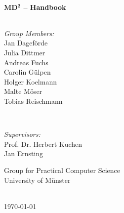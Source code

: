 \documentclass[a4paper, 12pt, titlepage, headsepline, listof = totoc, bibliography = totoc, numbers = noenddot]{scrbook} %
\begin{document}
\begin{titlepage}
\HRule \\[0.8cm]
{ \huge \bfseries MD$\mathbf{^2}$ -- Handbook}\\[0.4cm] %
\HRule \\[3cm]
 

\begin{minipage}[t]{0.4\textwidth}
\begin{flushleft} \large
\emph{Group Members:}\\
Jan Dageförde\\
Julia Dittmer\\
Andreas Fuchs\\
Carolin Gülpen\\
Holger Koelmann\\
Malte Möser\\
Tobias Reischmann
\end{flushleft}
\end{minipage}
~
\begin{minipage}[t]{0.5\textwidth}
\begin{flushright}\large

\emph{Supervisors:}\\
Prof. Dr. Herbert Kuchen\\
Jan Ernsting\\\bigskip

Group for Practical Computer Science \\
University of Münster\\
\end{flushright}
\end{minipage}\\[3cm]



{\large \today}\\[3cm] %


 

\vfill %

\end{titlepage}
\end{document}
